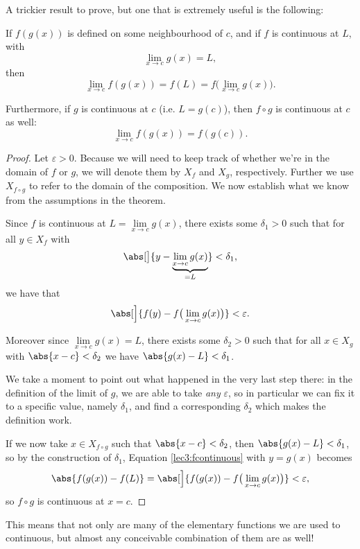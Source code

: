 \noindent
A trickier result to prove, but one that is extremely useful is the following:

\begin{theorem}
	If $f(g(x))$ is defined on some neighbourhood of $c$, and if $f$ is continuous at $L$, with
	\[
		\lim_{x \to c} g(x) = L,
	\]
	then
	\[
		\lim_{x \to c} f(g(x)) = f(L) = f \big ( \lim_{x \to c} g(x) \big ).
	\]

	\noindent
	Furthermore, if $g$ is continuous at $c$ (i.e. $L = g(c)$), then $f \circ g$ is continuous at $c$ as well:
	\[
		\lim_{x \to c} f(g(x)) = f(g(c)).
	\]
\end{theorem}

\begin{proof}
	Let $\varepsilon > 0$. Because we will need to keep track of whether we're in the domain of $f$ or $g$, we will denote them by $X_f$ and $X_g$, respectively. Further we use $X_{f \circ g}$ to refer to the domain of the composition. We now establish what we know from the assumptions in the theorem.

	Since $f$ is continuous at $L = \lim\limits_{x \to c} g(x)$, there exists some $\delta_1 > 0$ such that for all $y \in X_f$ with
	\[
		\abs[\big]{y - \underbrace{\lim_{x \to c} g(x)}_{= L}} < \delta_1,
	\]
	we have that
	\begin{equation}\label{lec3:fcontinuous}
		\abs[\Big]{f(y) - f \big ( \lim_{x \to c} g(x) \big ) } < \varepsilon.
	\end{equation}

	\noindent
	Moreover since $\lim\limits_{x \to c} g(x) = L$, there exists some $\delta_2 > 0$ such that for all $x \in X_g$ with $\abs{x - c} < \delta_2$ we have $\abs{g(x) - L} < \delta_1$.

	We take a moment to point out what happened in the very last step there: in the definition of the limit of $g$, we are able to take \emph{any} $\varepsilon$, so in particular we can fix it to a specific value, namely $\delta_1$, and find a corresponding $\delta_2$ which makes the definition work.

	If we now take $x \in X_{f \circ g}$ such that $\abs{x - c} < \delta_2$, then $\abs{g(x) - L} < \delta_1$, so by the construction of $\delta_1$, Equation \eqref{lec3:fcontinuous} with $y = g(x)$ becomes
	\[
		\abs{f(g(x)) - f(L)} = \abs[\Big]{f(g(x)) - f \big ( \lim_{x \to c} g(x) \big )} < \varepsilon,
	\]
	so $f \circ g$ is continuous at $x = c$.
\end{proof}

\noindent
This means that not only are many of the elementary functions we are used to continuous, but almost any conceivable combination of them are as well!


